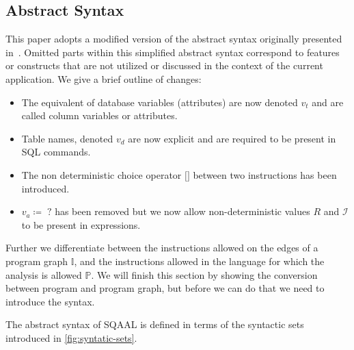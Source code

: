 \subsection{Abstract Syntax} \label{subsec:abstract-syntax}

This paper adopts a modified version of the abstract syntax originally presented in~\cite{cortesi_abstract_2013}.
Omitted parts within this simplified abstract syntax correspond to features or constructs that are not utilized or discussed in the context of the current application.
We give a brief outline of changes:
\begin{itemize}
    \item The equivalent of database variables (attributes) are now denoted $v_t$ and are called column variables or attributes.
    \item Table names, denoted $v_d$ are now explicit and are required to be present in SQL commands.
    \item The non deterministic choice operator $\texttt{[]}$ between two instructions has been introduced.
    \item $v_a \coloneq \; ?$ has been removed but we now allow non-deterministic values $R$ and $\mathscr{I}$ to be present in expressions.
\end{itemize}

Further we differentiate between the instructions allowed on the edges of a program graph $\mathbb{I}$, and the instructions allowed in the language for which the analysis is allowed $\mathbb{P}$.
We will finish this section by showing the conversion between program and program graph, but before we can do that we need to introduce the syntax.

The abstract syntax of SQAAL is defined in terms of the syntactic sets introduced in \autoref{fig:syntatic-sets}.

